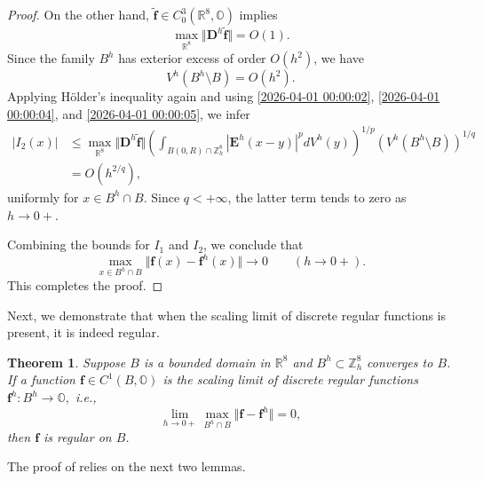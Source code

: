 \documentclass{amsart}
\newtheorem{theorem}{Theorem}[section]
\theoremstyle{definition}
\theoremstyle{remark}
\numberwithin{equation}{section}
\newcommand{\R}{\mathbb{R}}
\newcommand{\OO}{\mathbb O}
\newcommand{\Z}{\mathbb Z}
\newcommand{\f}{\bm{f}}
\newcommand{\E}{\bm{E}}
\begin{document}
\begin{proof}
    On the other hand, $\bm {\tilde f}\in C^3_0(\R^8,\OO)$ implies
    \begin{equation}
        \label{2026-04-01 00:00:04}
        \max_{\R^8}\Vert \bm D^h\bm{\tilde f}\Vert =O(1).
    \end{equation}
    Since the family $B^h$ has exterior excess of order $O(h^2)$, we have
    \begin{equation}
        \label{2026-04-01 00:00:05}
        V^h(B^h\setminus B)=O(h^2).
    \end{equation}
    Applying Hölder's inequality again and using \eqref{2026-04-01 00:00:02}, \eqref{2026-04-01 00:00:04}, and \eqref{2026-04-01 00:00:05}, we infer
    \begin{equation*}
        \begin{aligned}
            |I_2(x)|
            &\le \max_{\R^8}\Vert \bm D^h \bm{\tilde f}\Vert
            \left(\int_{B(0,R)\cap \Z_h^8} |\E^h(x-y)|^p dV^h(y)\right)^{1/p}
            \left(V^h(B^h\setminus B)\right)^{1/q}\\
            &=O\!\left(h^{2/q}\right),
        \end{aligned}
    \end{equation*}
    uniformly for $x\in B^h\cap B$.
    Since $q<+\infty$, the latter term tends to zero as $h\to 0+$.

    Combining the bounds for $I_1$ and $I_2$, we conclude that
    \begin{equation*}
        \max_{x\in B^h\cap B}\Vert \f(x)-\f^h(x)\Vert \to 0
        \qquad (h\to 0+).
    \end{equation*}
    This completes the proof.
\end{proof}

Next, we demonstrate that when the scaling limit of discrete regular functions is present, it is indeed regular.

\begin{theorem}\label{thm:scaling-limit-regularity}\label{2023-09-11 20:33:47}
    Suppose $B$ is a bounded domain in $\R^8$ and $B^h \subset  \Z^8_h$ converges to $B$. If a function $\f \in C^1(B,\OO)$ is the scaling limit of discrete regular functions $\f^h : B^h \longrightarrow \OO,$ i.e., \[
\lim_{ h\to 0+} \max_{ B^h \cap B} \Vert \f-\f^h\Vert  =0,
\] then $\f$ is regular on $B$.
\end{theorem}




The proof of  relies on the next two lemmas.
\end{document}
